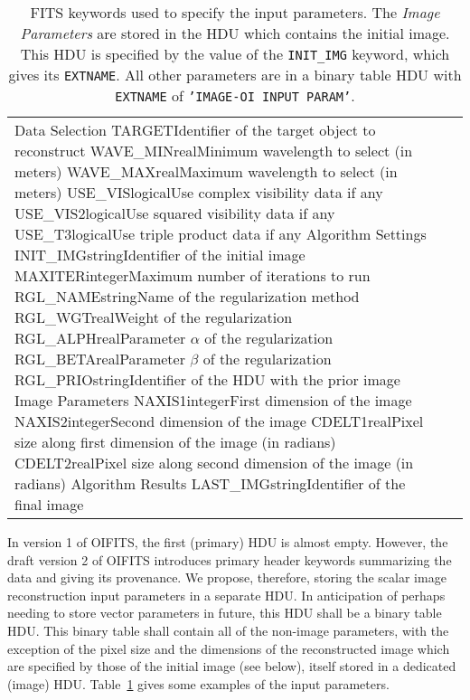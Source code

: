 \documentclass{article}
\newcommand*{\ROW}{} %
\newcommand*{\ROWTITLE}{} %
\newcommand{\oops}[1]{\DarkRed{#1}}
\newcommand{\KEYWORD}[1]{\texttt{#1}} %
\newcommand{\STRING}[1]{\texttt{'#1'}} %
\begin{document}
\begin{table}
\caption{FITS keywords used to specify the input parameters.  The
  \emph{Image Parameters} are stored in the HDU which contains the
  initial image. This HDU is specified by the value of the
  \KEYWORD{INIT\_IMG} keyword, which gives its \KEYWORD{EXTNAME}. All
  other parameters are in a binary table HDU with \KEYWORD{EXTNAME} of
  \STRING{IMAGE-OI INPUT PARAM}. \label{tab:input-params}}

\begin{tabular}{lcl}
  \hline
  \ROWTITLE{Data Selection}
  \hline
  \ROW{TARGET}{\oops{string}}{Identifier of the target object to reconstruct}
  \ROW{WAVE\_MIN}{real}{Minimum wavelength to select (in meters)}
  \ROW{WAVE\_MAX}{real}{Maximum wavelength to select (in meters)}
  \ROW{USE\_VIS}{logical}{Use complex visibility data if any}
  \ROW{USE\_VIS2}{logical}{Use squared visibility data if any}
  \ROW{USE\_T3}{logical}{Use triple product data if any}
  \hline
  \ROWTITLE{Algorithm Settings}
  \hline
  \ROW{INIT\_IMG}{string}{Identifier of the initial image}
  \ROW{MAXITER}{integer}{Maximum number of iterations to run}
  \ROW{RGL\_NAME}{string}{Name of the regularization method}
  \ROW{RGL\_WGT}{real}{Weight of the regularization}
  \ROW{RGL\_ALPH}{real}{Parameter $\alpha$ of the regularization}
  \ROW{RGL\_BETA}{real}{Parameter $\beta$ of the regularization}
  \ROW{RGL\_PRIO}{string}{Identifier of the HDU with the prior image}
  \hline
  \ROWTITLE{Image Parameters}
  \hline
  \ROW{NAXIS1}{integer}{First dimension of the image}
  \ROW{NAXIS2}{integer}{Second dimension of the image}
  \ROW{CDELT1}{real}{Pixel size along first dimension of the image (in radians)}
  \ROW{CDELT2}{real}{Pixel size along second dimension of the image (in radians)}
  \hline
  \ROWTITLE{Algorithm Results}
  \hline
  \ROW{LAST\_IMG}{string}{Identifier of the final image}
  \hline
\end{tabular}
\end{table}

In version 1 of OIFITS, the first (primary) HDU is almost
empty. However, the draft version 2 of OIFITS introduces primary
header keywords summarizing the data and giving its provenance. We
propose, therefore, storing the scalar image reconstruction input
parameters in a separate HDU. In anticipation of perhaps needing to
store vector parameters in future, this HDU shall be a binary table
HDU. This binary table shall contain all of the non-image parameters,
with the exception of the pixel size and the dimensions of the
reconstructed image which are specified by those of the initial image
(see below), itself stored in a dedicated (image)
HDU. Table~\ref{tab:input-params} gives some examples of the input
parameters.
\end{document}
